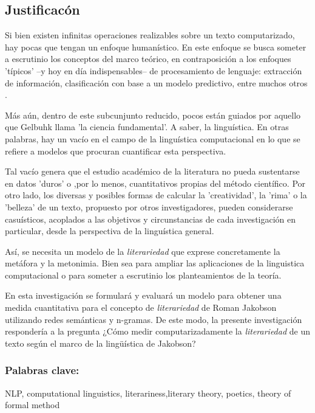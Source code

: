 \documentclass[twoside]{article}
\begin{document}
\subsection{Justificacón}
\label{sec:org8015866}

Si bien existen infinitas operaciones realizables sobre un texto
computarizado, hay pocas que tengan un enfoque humanístico. En este
enfoque se busca someter a escrutinio los conceptos del marco teórico,
en contraposición a los enfoques 'típicos' --y hoy en día
indispensables-- de procesamiento de lenguaje: extracción de
información, clasificación con base a un modelo predictivo, entre
muchos otros \cite{gelbukh2004}.

Más aún, dentro de este subcunjunto reducido, pocos están guiados por
aquello que Gelbuhk llama 'la ciencia fundamental'. A saber, la
linguística. En otras palabras, hay un vacío en el campo de la
linguística computacional en lo que se refiere a modelos que procuran
cuantificar esta perspectiva.

Tal vacío genera que el estudio académico de la literatura no pueda
sustentarse en datos 'duros' o ,por lo menos, cuantitativos propias
del método científico. Por otro lado, los diversas y posibles formas
de calcular la 'creatividad', la 'rima' o la 'belleza' de un texto,
propuesto por otros investigadores, pueden considerarse casuísticos,
acoplados a las objetivos y circunstancias de cada investigación en
particular, desde la perspectiva de la linguística general.

Así, se necesita un modelo de la \emph{literariedad} que exprese
concretamente la metáfora y la metonimia. Bien sea para ampliar las
aplicaciones de la linguistica computacional o para someter a
escrutinio los planteamientos de la teoría.

En esta investigación se formulará y evaluará un modelo para obtener
una medida cuantitativa para el concepto de \emph{literariedad} de Roman
Jakobson utilizando redes semánticas y n-gramas. De este modo, la
presente investigación respondería a la pregunta ¿Cómo medir
computarizadamente la \emph{literariedad} de un texto según el marco de la
lingüística de Jakobson?

\subsubsection{\textbf{Palabras clave:}}
\label{sec:org831cf29}
NLP, computational linguistics, literariness,literary theory, poetics, theory of formal method
\end{document}
